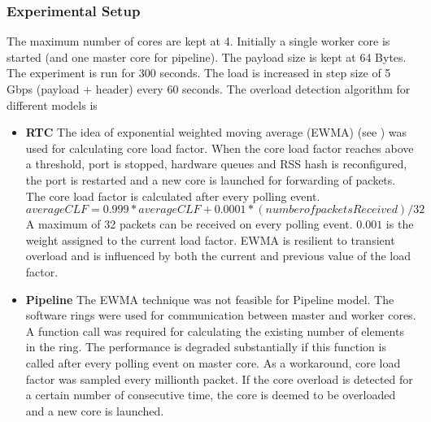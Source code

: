 \subsubsection{Experimental Setup}
The maximum number of cores are kept at 4. Initially a single worker core is started (and
one master core for pipeline). The payload size is kept at 64 Bytes. The experiment is run
for 300 seconds. The load is increased in step size of 5 Gbps (payload + header) every 60 
seconds.
The overload detection algorithm for different models is 
\begin{itemize}
    \item  \textbf{RTC} The idea of exponential weighted moving average (EWMA) (see \cite{ewma})
     was used for calculating core load factor. When the core load factor reaches above a
      threshold, port is stopped, hardware queues and RSS hash is reconfigured, the port
       is restarted and a new core is launched for forwarding of packets.
    The core load factor is calculated after every polling event. 
   \[ averageCLF = 0.999 * averageCLF + 0.0001 * (number of packets Received)/32\] 
   A maximum of 32 packets can be received on every polling event. $0.001$ is the weight 
   assigned to the current load factor. EWMA is resilient to transient overload and is influenced by both the current and previous value of the load factor.

    \item \textbf{Pipeline} The EWMA technique was not feasible for Pipeline model. 
        The software rings were used for communication between master and worker cores. A function call was required for calculating the existing number of elements in the ring. The performance is degraded substantially if this function is called after every polling event on master core. As a workaround, core load factor was sampled every millionth packet. If the core overload is detected for a certain number of consecutive time, the core is deemed to be overloaded and a new core is launched.
\end{itemize}

